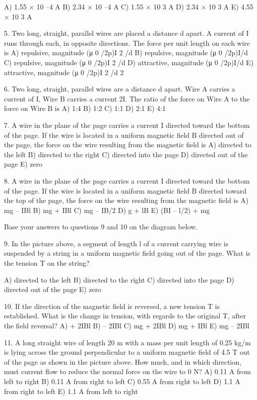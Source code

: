A) 1.55 × 10 –4 A
B) 2.34 × 10 –4 A
C) 1.55 × 10 3 A
D) 2.34 × 10 3 A
E) 4.55 × 10 3 A

5. Two long, straight, parallel wires are placed a distance d
apart. A current of I runs through each, in opposite
directions. The force per unit length on each wire is
A) repulsive, magnitude (μ 0 /2p)I 2 /d
B) repulsive, magnitude (μ 0 /2p)I/d
C) repulsive, magnitude (μ 0 /2p)I 2 /d
D) attractive, magnitude (μ 0 /2p)I/d
E) attractive, magnitude (μ 0 /2p)I 2 /d 2

6. Two long, straight, parallel wires are a distance d apart.
Wire A carries a current of I, Wire B carries a current 2I.
The ratio of the force on Wire A to the force on Wire B is
A) 1:4
B) 1:2
C) 1:1
D) 2:1
E) 4:1


7. A wire in the plane of the page carries a current I directed
toward the bottom of the page. If the wire is located in a
uniform magnetic field B directed out of the page, the force
on the wire resulting from the magnetic field is
A) directed to the left
B) directed to the right
C) directed into the page
D) directed out of the page
E) zero

8. A wire in the plane of the page carries a current I directed
toward the bottom of the page. If the wire is located in a
uniform magnetic field B directed toward the top of the
page, the force on the wire resulting from the magnetic field
is
A) mg – IBl
B) mg + IBl
C) mg – IB/2
D) g + lB
E) (BI – l/2) + mg

Base your answers to questions 9 and 10 on the diagram below.

9. In the picture above, a segment of length l of a current
carrying wire is suspended by a string in a uniform
magnetic field going out of the page. What is the tension T
on the string?

A) directed to the left
B) directed to the right
C) directed into the page
D) directed out of the page
E) zero

10. If the direction of the magnetic field is reversed, a new
tension T is established. What is the change in
tension, with regards to the original T, after the field
reversal?
A) + 2IBl
B) – 2IBl
C) mg + 2IBl
D) mg + IBl
E) mg – 2IBl






11.
A long straight wire of length 20 m with a mass per unit
length of 0.25 kg/m is lying across the ground
perpendicular to a uniform magnetic field of 4.5 T out of
the page as shown in the picture above. How much, and in
which direction, must current flow to reduce the normal
force on the wire to 0 N?
A) 0.11 A from left to right
B) 0.11 A from right to left
C) 0.55 A from right to left
D) 1.1 A from right to left
E) 1.1 A from left to right


